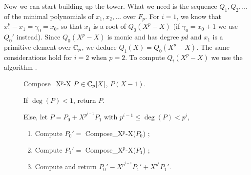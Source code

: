 Now we can start building up the tower. What we need is the sequence
$Q_1,Q_2,\ldots$ of the minimal polynomials of $x_1,x_2,\ldots$ over
$F_p$. For $i=1$, we know that $x_1^p-x_1=\gamma_0=x_0$, so that $x_1$
is a root of $Q_0(X^p-X)$ (if $\gamma_0=x_0+1$ we use $Q_0'$
instead). Since $Q_0(X^p-X)$ is monic and has degree $pd$ and $x_1$ is
a primitive element over $\mathbb{C}_p$, we deduce $Q_1(X)=Q_0(X^p-X)$. The
same considerations hold for $i=2$ when $p=2$. To compute $Q_i(X^p-X)$
we use the algorithm .

\begin{figure}[!h]
  \begin{algorithm}
    {Compose\_X$^p$-X}
    {$P\in\mathbb{C}_p[X]$,}
    {$P(X-1)$.}
  \item If $\deg(P) < 1$, return $P$.
  \item Else, let $P = P_0 + X^{p^{i-1}}P_1$ with $p^{i-1}\le\deg(P)<p^i$,
    \begin{enumerate}
      \item Compute $P_0' =$ Compose\_X$^p$-X($P_0$) ;
      \item Compute $P_1' =$ Compose\_X$^p$-X($P_1$) ;
      \item \label{alg:compose-xp-x:sum}Compute and return $P_0' -
        X^{p^{i-1}}P_1' + X^{p^i}P_1'$.
    \end{enumerate}
  \end{algorithm}
\end{figure}

